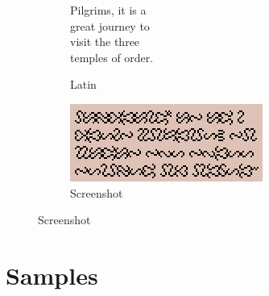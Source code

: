 \documentclass[letterpaper]{article}
\newcommand{\sampletext}[1]{{\samplefont\Large#1}}
\begin{document}
\begin{figure}
\begin{subfigure}{0.32\textwidth}
{    }
  \end{subfigure}
  \begin{subfigure}{0.32\textwidth}
    \centering
    \caption{Latin}
    \sampletext{
      Pilgrims, it is a\\
      great journey to\\
      visit the three\\
      temples of order.\\
    }
  \end{subfigure}
  \begin{subfigure}{0.32\textwidth}
    \centering
    \caption{Screenshot}

    \includegraphics[scale=0.75]{ophidian-book}
  \end{subfigure}
  
\end{figure}

\section{Samples}
\end{document}
